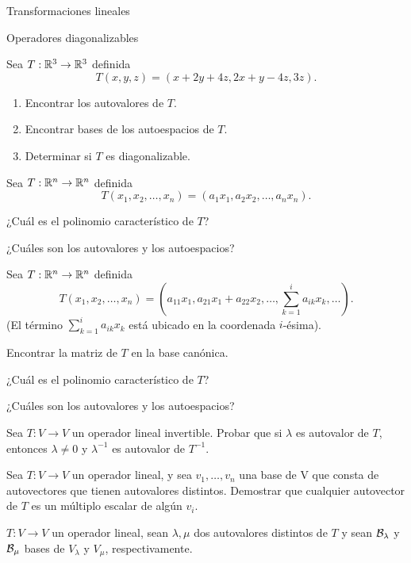 \begin{chapter}{Transformaciones lineales}
\begin{section}{Operadores diagonalizables}
        \begin{enumex}
            \item  Sea $T: \mathbb R^3 \to \mathbb R^3$ definida
            $$
            T(x,y,z) = (x+2y+4z, 2x+y-4z, 3z).
            $$
            \begin{enumerate}
                \item Encontrar los autovalores de $T$.
                \item Encontrar  bases de los autoespacios de $T$.
                \item Determinar si $T$  es diagonalizable.
            \end{enumerate}
            \item Sea $T: \mathbb R^n \to \mathbb R^n$ definida 
            $$
            T(x_1,x_2,\ldots,x_n) =(a_1x_1,a_2x_2,\ldots, a_nx_n).
            $$
            \begin{enumex}
                \item ¿Cuál es el polinomio característico de $T$?
                \item ¿Cuáles son los autovalores y los autoespacios?
            \end{enumex}
            \item Sea $T: \mathbb R^n \to \mathbb R^n$ definida 
            $$
            T(x_1,x_2,\ldots,x_n) =(a_{11}x_1,a_{21} x_1+ a_{22}x_2,\ldots,\sum_{k=1}^ia_{ik}x_k,\ldots).
            $$
            (El  término $\sum_{k=1}^ia_{ik}x_k$ está ubicado en la coordenada $i$-ésima).
            \begin{enumex}
                \item Encontrar la matriz de $T$  en la base canónica.
                \item ¿Cuál es el polinomio característico de $T$?
                \item ¿Cuáles son los autovalores y los autoespacios?
            \end{enumex}
            \item Sea $T: V \to V$ un operador lineal invertible. Probar que si $\lambda$ es autovalor de $T$,  entonces $\lambda \ne 0$ y $\lambda^{-1}$  es autovalor de $T^{-1}$.
            \item Sea $T: V \to V$ un operador lineal, y sea ${v_1,\ldots,v_n}$ una base de V que consta de autovectores que tienen autovalores distintos. Demostrar que cualquier autovector de $T$ es un múltiplo escalar de algún $v_i$.
            \item $T: V \to V$ un operador lineal, sean $\lambda, \mu$ dos autovalores distintos de $T$ y sean $\mathcal{B}_\lambda$ y $\mathcal{B}_\mu$ bases de  $V_\lambda$ y $V_\mu$, respectivamente. 
            

\end{enumex}
\end{section}
\end{chapter}
